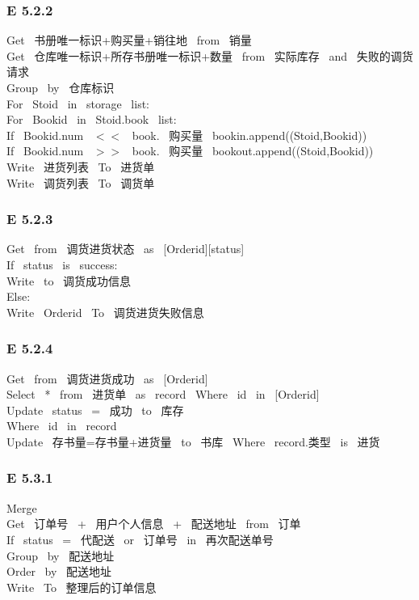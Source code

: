 \documentclass{article}
\begin{document}
\begin{CJK*}{UTF8}{gbsn}
\subsubsection*{E 5.2.2}
Get \ 书册唯一标识+购买量+销往地 \ from \ 销量\\ 
Get \ 仓库唯一标识+所存书册唯一标识+数量 \ from \ 实际库存 \ and \ 失败的调货请求 \\ 
Group \ by \ 仓库标识\\ 
For \ Stoid \ in \ storage \ list:\\ 
For \ Bookid \ in \ Stoid.book \ list:\\ 
If \ Bookid.num \ $<<$ \ book. \ 购买量 \ bookin.append((Stoid,Bookid))\\ 
If \ Bookid.num \ $>>$ \ book. \ 购买量 \ bookout.append((Stoid,Bookid)) \\ 
Write \ 进货列表 \ To \ 进货单\\ 
Write \ 调货列表 \ To \ 调货单\\ 
\vspace{-1mm}
\subsubsection*{E 5.2.3}
Get \ from \ 调货进货状态 \ as \ [Orderid][status] \\ 
If \ status \ is \ success:\\ 
Write \ to \ 调货成功信息\\ 
Else:\\ 
Write \ Orderid \ To \ 调货进货失败信息\\ 
\vspace{-1mm}
\subsubsection*{E 5.2.4}
Get \ from \ 调货进货成功 \ as \ [Orderid] \\ 
Select \ * \ from \ 进货单 \ as \ record \ Where \ id \ in \ [Orderid] \\ 
Update \ status \ = \ 成功 \ to \ 库存\\ 
Where \ id \ in \ record\\ 
Update \ 存书量=存书量+进货量 \ to \ 书库 \ Where \ record.类型 \ is \ 进货\\ 
\vspace{-1mm}
\subsubsection*{E 5.3.1}
Merge\\ 
Get \ 订单号 \ + \ 用户个人信息 \ + \ 配送地址 \ from \ 订单 \\ 
If \ status \ = \ 代配送 \ or \ 订单号 \ in \ 再次配送单号 \\ 
Group \ by \ 配送地址\\ 
Order \ by \ 配送地址\\ 
Write \ To \ 整理后的订单信息\\ 
\vspace{-1mm}

\end{CJK*}
\end{document}

